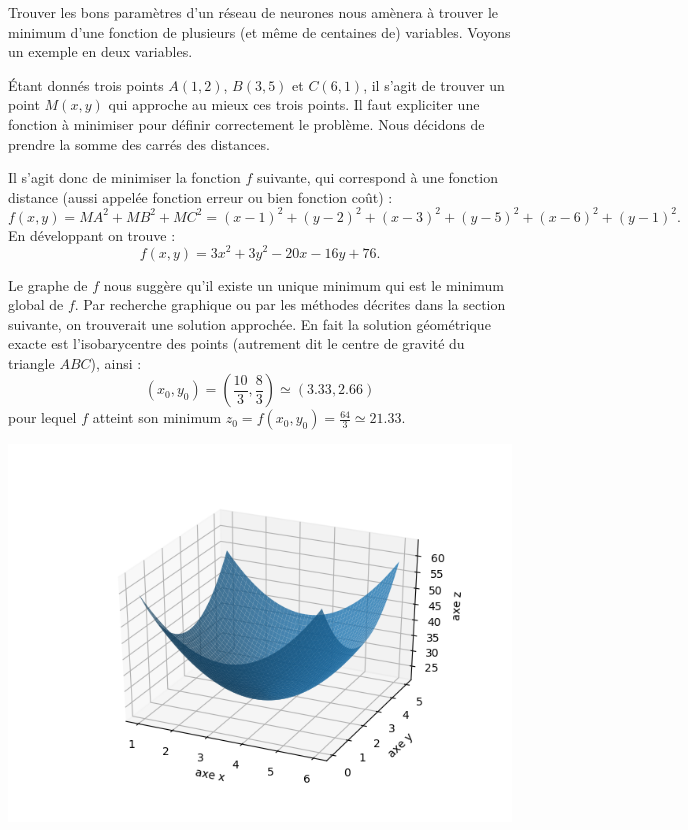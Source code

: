 Trouver les bons paramètres d'un réseau de neurones nous amènera à trouver le minimum d'une fonction de plusieurs (et même de centaines de) variables. Voyons un exemple en deux variables.
\begin{exemple}{}{}
	Étant donnés trois points $A(1,2)$, $B(3,5)$ et $C(6,1)$, il s'agit de trouver un point $M(x,y)$ qui \og{}approche au mieux\fg{} ces trois points. Il faut expliciter une fonction à minimiser pour définir correctement le problème. Nous décidons de prendre la somme des carrés des distances.
	
	
	
	Il s'agit donc de minimiser la fonction $f$ suivante, qui correspond à une fonction distance (aussi appelée fonction erreur ou bien fonction coût) :
	$$f(x,y) = MA^2+MB^2+MC^2 = 
	(x-1)^2+ (y-2)^2 + (x-3)^2 + (y-5)^2 + (x-6)^2 + (y-1)^2.$$
	En développant on trouve :
	$$f(x,y) = 3x^2 + 3y^2 - 20x - 16y + 76.$$
	
	Le graphe de $f$ nous suggère qu'il existe un unique minimum qui est le minimum global de $f$. 
	Par recherche graphique ou par les méthodes décrites dans la section suivante, on trouverait une solution approchée. En fait la solution géométrique exacte est l'isobarycentre des points (autrement dit le centre de gravité du triangle $ABC$), ainsi :
	$$(x_0,y_0) = \left(\frac{10}{3},\frac83\right) \simeq (3.33,2.66)$$
	pour lequel $f$ atteint son minimum $z_0 = f(x_0,y_0) = \frac{64}{3} \simeq 21.33$.
	
	\begin{center}
		\includegraphics[scale=\myscale,scale=0.7]{figures/fonctions-surface-4}
	\end{center}
	

\end{exemple}

